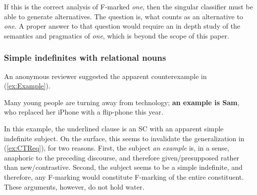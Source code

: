 \documentclass[
	letterpaper,
]{article}
\begin{document}
If this is the correct analysis of F-marked \textit{one}, then the singular classifier must be able to generate alternatives.
The question is, what counts as an alternative to \textit{one}.
A proper answer to that question would require an in depth study of the semantics and pragmatics of \textit{one}, which is beyond the scope of this paper.
%
%

\subsubsection{Simple indefinites with relational nouns}
An anonymous reviewer suggested the apparent counterexample in (\ref{ex:Example}).
\begin{exe}
	\ex\label{ex:Example} Many young people are turning away from technology; \textbf{an example is Sam}, who replaced her iPhone with a flip-phone this year.
\end{exe}
In this example, the underlined clause is an SC with an apparent simple indefinite subject.
On the surface, this seems to invalidate the generalization in (\ref{ex:CTReq}), for two reasons.
First, the subject \textit{an example} is, in a sense, anaphoric to the preceding discourse, and therefore given/presupposed rather than new/contrastive.
Second, the subject seems to be a simple indefinite, and therefore, any F-marking would constitute F-marking of the entire constituent.
These arguments, however, do not hold water.
\end{document}
